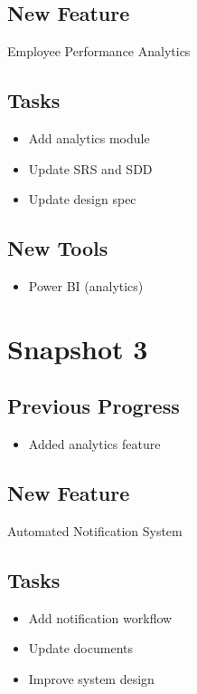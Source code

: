 \documentclass[12pt]{article}
\begin{document}
\subsection{New Feature}
Employee Performance Analytics

\subsection{Tasks}
\begin{itemize}
    \item Add analytics module
    \item Update SRS and SDD
    \item Update design spec
\end{itemize}

\subsection{New Tools}
\begin{itemize}
    \item Power BI (analytics)
\end{itemize}

\section{Snapshot 3}

\subsection{Previous Progress}
\begin{itemize}
    \item Added analytics feature
\end{itemize}

\subsection{New Feature}
Automated Notification System

\subsection{Tasks}
\begin{itemize}
    \item Add notification workflow
    \item Update documents
    \item Improve system design
\end{itemize}
\end{document}
